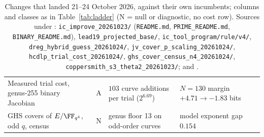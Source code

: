 \begin{table}[p]
\begin{tabularx}{\linewidth}{@{}>{\raggedright}Xl>{\raggedright}p{3.6cm}>{\raggedright\arraybackslash}p{3.2cm}@{}}
Measured trial cost, genus-255 binary Jacobian & A & $103$ curve additions per trial ($2^{6.69}$) & $N=130$ margin $+4.71\to-1.83$ bits \\
GHS covers of $E/\FF_{q^4}$, odd $q$, census & N & genus floor 13 on odd-order curves & model exponent gap $0.154$ \\
\bottomrule
\end{tabularx}
\caption[]{Changes that landed 21--24 October 2026, against their own
incumbents; columns and classes as in Table~\ref{tab:ladder} (N = null or
diagnostic, no cost row). Sources under :
\texttt{ic\_improve\_20261023/} (\texttt{README.md},
\texttt{PRIME\_README.md}, \texttt{BINARY\_README.md}),
\texttt{lead19\_projected\_base/}, \texttt{ic\_tool\_program/rule/v4/},
\texttt{dreg\_hybrid\_guess\_20261024/}, \texttt{jv\_cover\_p\_scaling\_20261024/},
\texttt{hcdlp\_trial\_cost\_20261024/}, \texttt{ghs\_cover\_census\_n4\_20261024/},
\texttt{coppersmith\_s3\_theta2\_20261023/}; and
.}
\label{tab:ladder3}
\end{table}

